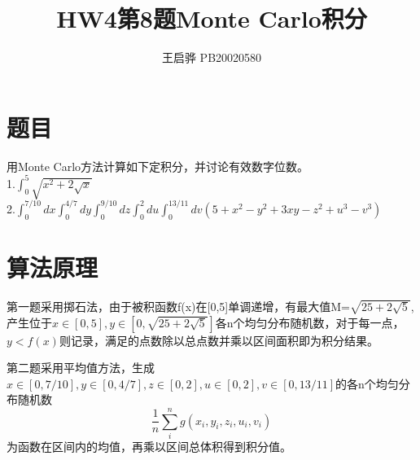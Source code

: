 \documentclass{article}
\title{\songti \zihao{2}\bfseries HW4第8题Monte Carlo积分}
\author{王启骅 PB20020580}
\begin{document}
	\maketitle
	\section{题目}
用Monte Carlo方法计算如下定积分，并讨论有效数字位数。\\
1.$ \int_{0}^{5}\sqrt{x^2+2\sqrt{x}} $\\
2.$ \int_{0}^{7/10}dx\int_{0}^{4/7}dy\int_{0}^{9/10}dz\int_{0}^{2}du\int_{0}^{13/11}dv(5+x^2-y^2+3xy-z^2+u^3-v^3) $

	\section{算法原理}
第一题采用掷石法，由于被积函数f(x)在[0,5]单调递增，有最大值M=$ \sqrt{25+2\sqrt{5}} $,产生位于$ x\in [0,5],y\in [0,\sqrt{25+2\sqrt{5}}] $各n个均匀分布随机数，对于每一点，$ y<f(x) $则记录，满足的点数除以总点数并乘以区间面积即为积分结果。


第二题采用平均值方法，生成$ x\in [0,7/10],y\in [0,4/7],z\in [0,2],u\in[0,2],v\in[0,13/11] $的各n个均匀分布随机数
\begin{equation}
	\frac{1}{n}\sum_{i}^{n}g(x_i,y_i,z_i,u_i,v_i)
\end{equation}
为函数在区间内的均值，再乘以区间总体积得到积分值。
\end{document}
